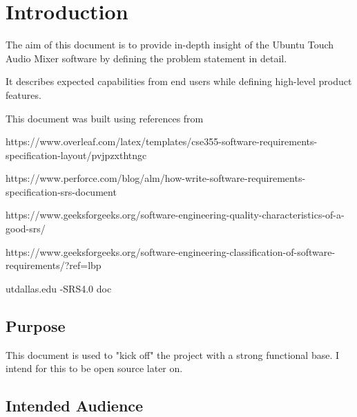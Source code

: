 



\chapter{Introduction}
\label{ch:intro}
The aim of this document is to provide in-depth insight of the Ubuntu Touch Audio Mixer software by defining the problem statement in detail. 

It describes expected capabilities from end users while defining high-level product features.



This document was built using references from


\leavevmode
\newline
https://www.overleaf.com/latex/templates/cse355-software-requirements-specification-layout/pvjpzxthtngc

\leavevmode
\newline
https://www.perforce.com/blog/alm/how-write-software-requirements-specification-srs-document

\leavevmode
\newline
https://www.geeksforgeeks.org/software-engineering-quality-characteristics-of-a-good-srs/

\leavevmode
\newline
https://www.geeksforgeeks.org/software-engineering-classification-of-software-requirements/?ref=lbp

\leavevmode
\newline
utdallas.edu -SRS4.0 doc


\section{Purpose }
This document is used to "kick off" the project with a strong functional base. 
I intend for this to be open source later on.



\section{Intended Audience}
